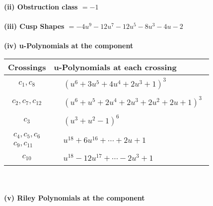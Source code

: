 \documentclass[1p]{elsarticle_modified}
\theoremstyle{definition}
\begin{document}
\flushleft \textbf{(ii) Obstruction class $= -1$}\\~\\
\flushleft \textbf{(iii) Cusp Shapes $= -4 u^9-12 u^7-12 u^5-8 u^3-4 u-2$}\\~\\
\newpage\renewcommand{\arraystretch}{1}
\flushleft \textbf{(iv) u-Polynomials at the component}\newline \\
\begin{tabular}{m{50pt}|m{274pt}}
Crossings & \hspace{64pt}u-Polynomials at each crossing \\
\hline $$\begin{aligned}c_{1},c_{8}\end{aligned}$$&$\begin{aligned}
&(u^6+3 u^5+4 u^4+2 u^3+1)^3
\end{aligned}$\\
\hline $$\begin{aligned}c_{2},c_{7},c_{12}\end{aligned}$$&$\begin{aligned}
&(u^6+u^5+2 u^4+2 u^3+2 u^2+2 u+1)^3
\end{aligned}$\\
\hline $$\begin{aligned}c_{3}\end{aligned}$$&$\begin{aligned}
&(u^3+u^2-1)^6
\end{aligned}$\\
\hline $$\begin{aligned}c_{4},c_{5},c_{6}\\c_{9},c_{11}\end{aligned}$$&$\begin{aligned}
&u^{18}+6 u^{16}+\cdots+2 u+1
\end{aligned}$\\
\hline $$\begin{aligned}c_{10}\end{aligned}$$&$\begin{aligned}
&u^{18}-12 u^{17}+\cdots-2 u^3+1
\end{aligned}$\\
\hline
\end{tabular}\\~\\
\newpage\renewcommand{\arraystretch}{1}
\flushleft \textbf{(v) Riley Polynomials at the component}\newline \\
\end{document}
